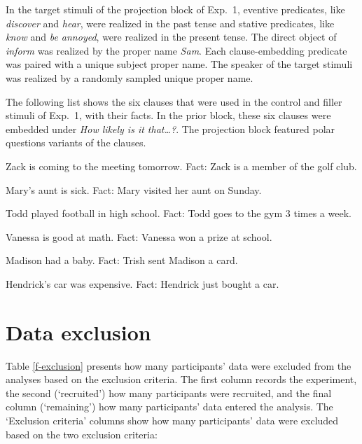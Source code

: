 \documentclass[11pt,fleqn]{article}
\newcommand{\6}{\mbox{$[\hspace*{-.6mm}[$}}
\newcommand{\9}{\mbox{$]\hspace*{-.6mm}]$}}
\begin{document}
In the target stimuli of the projection block of Exp.~1, eventive predicates, like {\em discover} and {\em hear}, were realized in the past tense and stative predicates, like {\em know} and {\em be annoyed}, were realized in the present tense. The direct object of {\em inform} was realized by the proper name {\em Sam}. Each clause-embedding predicate was paired with a unique subject proper name. The speaker of the target stimuli was realized by a randomly sampled unique proper name. 

The following list shows the six clauses that were used in the control and filler stimuli of Exp.~1, with their facts. In the prior block, these six clauses were embedded under {\em How likely is it that\ldots?}. The projection block featured polar questions variants of the clauses.

\begin{enumerate}[leftmargin=3ex,itemsep=-2pt]
\ex Zack is coming to the meeting tomorrow. Fact: Zack is a member of the golf club. 

\ex Mary's aunt is sick. Fact: Mary visited her aunt on Sunday. 

\ex Todd played football in high school. Fact: Todd goes to the gym 3 times a week. 

\ex Vanessa is good at math. Fact: Vanessa won a prize at school. 

\ex Madison had a baby. Fact: Trish sent Madison a card. 

\ex Hendrick's car was expensive. Fact: Hendrick just bought a car. 
\end{enumerate}

\section{Data exclusion}\label{a-exclusion}

Table \ref{f-exclusion} presents how many participants' data were excluded from the analyses based on the exclusion criteria. The first column records the experiment, the second (`recruited') how many participants were recruited, and the final column (`remaining') how many participants' data entered the analysis. The `Exclusion criteria' columns show how many participants' data were excluded based on the two exclusion criteria: 
\end{document}
